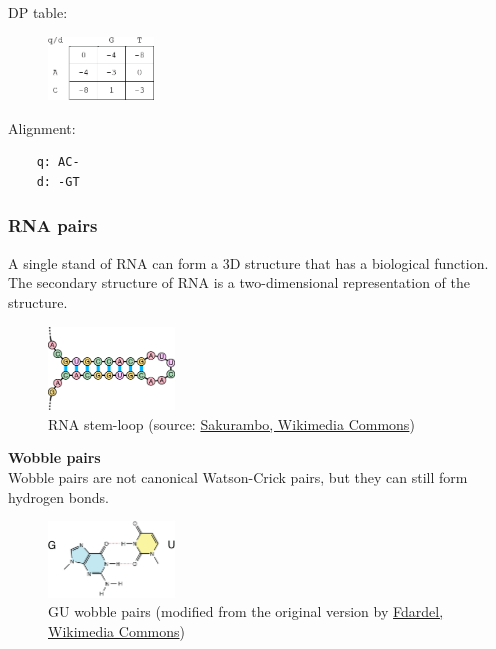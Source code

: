 \begin{multicols}{2}
DP table:
\begin{figure}[H]
  \centering
      \includegraphics[width=0.25\textwidth]{fig03/example_watson_crick_alignment.png}
\end{figure}

Alignment:
\begin{verbatim}
    q: AC-
    d: -GT
\end{verbatim}

\end{multicols} 

%
%
\subsubsection*{RNA pairs}
A single stand of RNA can form a 3D structure that has a biological function. The secondary structure of RNA is a two-dimensional representation of the structure. 

\begin{figure}[H]
  \centering
      \includegraphics[width=0.3\textwidth]{fig03/rna_stem_loop.png}
  \caption{RNA stem-loop (source: \href{https://commons.wikimedia.org/w/index.php?curid=815268}{Sakurambo, Wikimedia Commons})}
\end{figure}

\noindent \textbf{Wobble pairs} \\
\noindent Wobble pairs are not canonical Watson-Crick pairs, but they can still form hydrogen bonds.

\begin{figure}[H]
  \centering
      \includegraphics[width=0.3\textwidth]{fig03/rna_gu_wobble.png}
  \caption{GU wobble pairs \newline (modified  from the original version by \href{https://commons.wikimedia.org/w/index.php?curid=2636730}{Fdardel, Wikimedia Commons})}
\end{figure}

